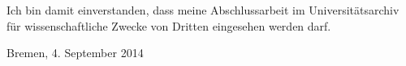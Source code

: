 \documentclass[a4paper, 10pt, twoside, openany]{book} %
\begin{document}
	Ich bin damit einverstanden, dass meine Abschlussarbeit im Universitätsarchiv für wissenschaftliche Zwecke von Dritten eingesehen werden darf.
	
	\vspace{1cm}
	
	\begin{flushright}
		Bremen, 4. September 2014
	\end{flushright}
	
	\listoffigures
	
	
	
\end{document}
